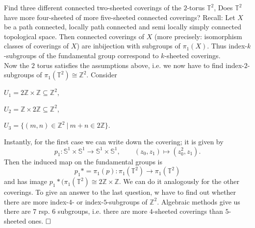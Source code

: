 \documentclass[11pt]{book}
\numberwithin{dummy}{section}
\theoremstyle{nonumberbreak}
\newenvironment{sol}[1][]{\ifthenelse{\equal{#1}{}}{\solution}{\solution[#1]}\rm}{\endsolution}
\newenvironment{prob}[1][]{\ifthenelse{\equal{#1}{}}{\problem}{\problem[#1]}\rm}{\endproblem}
\newcommand{\Sph}{\mathbb{S}}
\newcommand{\la}{\longrightarrow}
\newcommand{\Z}{\mathbb{Z}}
\begin{document}
\begin{spacing}{1.4}
\begin{prob}
\begin{sol}
\begin{compactenum}
\end{compactenum}
\end{sol}



\end{prob}


\begin{prob}    %
Find three different connected two-sheeted coverings of the $2$-torus $\mathbb{T}^2$, Does $\mathbb{T}^2$ have more four-sheeted of more five-sheeted connected coverings?
\begin{sol}
Recall: Let $X$ be a path connected, locally path connected and semi locally simply connected topological space. Then connected coverings of $X$ (more precisely: isomorphism classes of coverings of $X$) are inbijection with subgroups of $\pi_1(X)$. Thus index-$k$-subgroups of the fundamental group correspond to $k$-sheeted coverings.\\
Now the $2$ torus satisfies the assumptions above, i.e. we now have to find index-$2$-subgroups of $\pi_1(\mathbb{T}^2) \cong \Z^2$. Consider
\begin{compactenum}
\item $U_1 = 2\Z \times \Z \subseteq \Z^2$,
\item $U_2 = \Z \times 2\Z \subseteq \Z^2$,
\item $U_3 = \{(m,n) \in \Z^2 \ \vert \ m+n \in 2\Z\}$.
\end{compactenum}
Instantly, for the first case we can write down the covering; it is given by
$$p_1: \Sph^1 \times \Sph^1 \la \Sph^1 \times \Sph^1, \qquad (z_0, z_1) \mapsto (z_0^2, z_1).$$
Then the induced map on the fundamental groups is 
$$p_1* = \pi_1(p): \pi_1(\mathbb{T}^2) \la \pi_1(\mathbb{T}^2)$$
and has image $p_1*(\pi_1(\mathbb{T}^2) \cong 2\Z \times \Z$. We can do it analogously for the other coverings. To give an answer to the last question, w have to find out whether there are more index-$4$- or index-$5$-subgroups of $\Z^2$. Algebraic methods give us there are $7$ rsp. $6$ subgroups, i.e. there are more $4$-sheeted coverings than $5$-sheeted ones. $\hfill \Box$
\end{sol}

\end{prob}





\newpage


\titlespacing*{\section}{-16.5pt}{0pt}{20pt}
\renewcommand*\thesection{}

\end{spacing}
\end{document}
